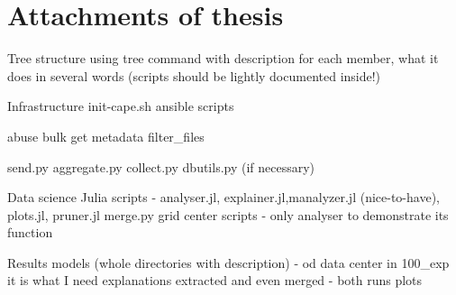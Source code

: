 \chapter{Attachments of thesis} \label{app:attach}

Tree structure using tree command with description for each member, what it does in several words (scripts should be lightly documented inside!)

Infrastructure
init-cape.sh
ansible scripts

abuse bulk
get metadata
filter_files

send.py
aggregate.py
collect.py
dbutils.py (if necessary)


Data science
Julia scripts - analyser.jl, explainer.jl,manalyzer.jl (nice-to-have), plots.jl, pruner.jl
merge.py
grid center scripts - only analyser to demonstrate its function

Results
models (whole directories with description) - od data center in 100_exp it is what I need
explanations extracted and even merged - both runs
plots